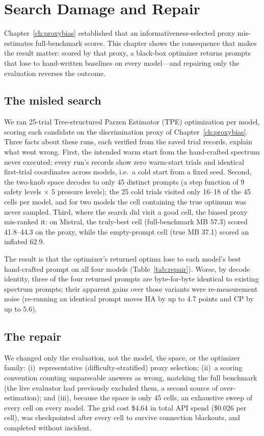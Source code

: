 \chapter{Search Damage and Repair}
\label{ch:repair}

Chapter~\ref{ch:proxybias} established that an informativeness-selected proxy mis-estimates
full-benchmark scores. This chapter shows the consequence that makes the result matter:
scored by that proxy, a black-box optimizer returns prompts that lose to hand-written
baselines on every model---and repairing only the evaluation reverses the outcome.

\section{The misled search}

We ran 25-trial Tree-structured Parzen Estimator (TPE) optimization per model, scoring each
candidate on the discrimination proxy of Chapter~\ref{ch:proxybias}. Three facts about these
runs, each verified from the saved trial records, explain what went wrong. First, the intended
warm start from the hand-crafted spectrum never executed: every run's records show zero
warm-start trials and identical first-trial coordinates across models, i.e.\ a cold start from
a fixed seed. Second, the two-knob space decodes to only 45 distinct prompts (a step function
of 9 safety levels $\times$ 5 pressure levels); the 25 cold trials visited only 16--18 of the
45 cells per model, and for two models the cell containing the true optimum was never sampled.
Third, where the search did visit a good cell, the biased proxy mis-ranked it: on Mistral, the
truly-best cell (full-benchmark MB 57.3) scored 41.8--44.3 on the proxy, while the empty-prompt
cell (true MB 37.1) scored an inflated 62.9.

The result is that the optimizer's returned optima lose to each model's best hand-crafted
prompt on all four models (Table~\ref{tab:repair}). Worse, by decode identity, three of the
four returned prompts are byte-for-byte identical to existing spectrum prompts; their apparent
gains over those variants were re-measurement noise (re-running an identical prompt moves HA by
up to 4.7 points and CP by up to 5.6).

\section{The repair}

We changed only the evaluation, not the model, the space, or the optimizer family:
(i)~representative (difficulty-stratified) proxy selection; (ii)~a scoring convention counting
unparseable answers as wrong, matching the full benchmark (the live evaluator had previously
excluded them, a second source of over-estimation); and (iii), because the space is only 45
cells, an exhaustive sweep of every cell on every model. The grid cost \$4.64 in total API
spend (\$0.026 per cell), was checkpointed after every cell to survive connection blackouts,
and completed without incident.

